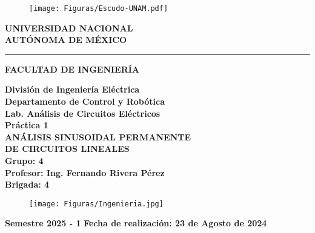\documentclass[10pt,openany]{book}
\begin{document}
\begin{titlepage}
\thispagestyle{empty}
\noindent
\begin{minipage}[c]{0.25\textwidth}%

\begin{figure}[H]
\texttt{[image: Figuras/Escudo-UNAM.pdf]}
\end{figure}
\end{minipage}\hfill\begin{minipage}[c]{0.75\textwidth}%
\begin{center}
\textbf{\Huge {UNIVERSIDAD NACIONAL\\[2mm]
AUTÓNOMA DE MÉXICO}}\vspace{5mm}
\hrule height 2.5pt \vspace{5mm}
\textbf{\Huge {FACULTAD DE INGENIERÍA}}
\end{center}
\end{minipage}

\noindent
\begin{minipage}[t]{0.25\textwidth}%
\vspace{5mm}
\hspace{0.9cm}
\vrule width2.5pt height13cm
\hspace{8mm}
\vrule width2.5pt height13cm
\end{minipage}\hfill\begin{minipage}[t]{0.75\textwidth}%

\begin{center}
\vspace{1cm}
\textbf{\huge {División de Ingeniería Eléctrica\\[2mm]
Departamento de Control y Robótica\\[2.5mm]
Lab. Análisis de Circuitos Eléctricos}}\\[1.5cm]

\textbf{\huge {Práctica 1}}\\[6mm]
\textbf{\LARGE {ANÁLISIS SINUSOIDAL PERMANENTE}}\\[6mm]
\textbf{\LARGE {DE CIRCUITOS LINEALES}}\\[10mm]
\textbf{\LARGE {Grupo: 4}}\\[10mm]
\textbf{\LARGE {Profesor: Ing. Fernando Rivera Pérez}}\\[10mm]
\textbf{\LARGE {Brigada: 4}}
\end{center}
\end{minipage}
\noindent
\begin{minipage}[T]{0.25\textwidth}%
\begin{figure}[H]
\texttt{[image: Figuras/Ingenieria.jpg]}
\end{figure}
\end{minipage}\hfill\begin{minipage}[c]{0.75\textwidth}%
\vspace{2cm}
\textbf{Semestre 2025 - 1} \hfill \textbf{Fecha de realización: 23 de Agosto de 2024}
\end{minipage}
\end{titlepage}
\end{document}
